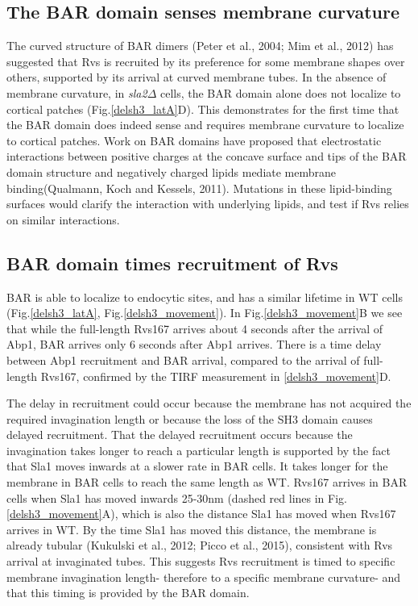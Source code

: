 \subsection{The BAR domain senses membrane curvature}
The curved structure of BAR dimers (Peter et al., 2004; Mim et al., 2012) has suggested that Rvs is recruited by its preference for some membrane shapes over others, supported by its arrival at curved membrane tubes. In the absence of membrane curvature, in \textit{sla2$\Delta$} cells, the BAR domain alone does not localize to cortical patches (Fig.\ref{delsh3_latA}D). This demonstrates for the first time that the BAR domain does indeed sense and requires membrane curvature to localize to cortical patches. Work on BAR domains have proposed that electrostatic interactions between positive charges at the concave surface and tips of the BAR domain structure and negatively charged lipids mediate membrane binding(Qualmann, Koch and Kessels, 2011). Mutations in these lipid-binding surfaces would clarify the interaction with underlying lipids, and test if Rvs relies on similar interactions.



\subsection{BAR domain times recruitment of Rvs} 

BAR is able to localize to endocytic sites, and has a similar lifetime in WT cells (Fig.\ref{delsh3_latA}, Fig.\ref{delsh3_movement}). In Fig.\ref{delsh3_movement}B we see that while the full-length Rvs167 arrives about 4 seconds after the arrival of Abp1, BAR arrives only 6 seconds after Abp1 arrives. There is a time delay between Abp1 recruitment and BAR arrival, compared to the arrival of full-length Rvs167, confirmed by the TIRF measurement in \ref{delsh3_movement}D. 

	\vspace{5mm}
The delay in recruitment could occur because the membrane has not acquired the required invagination length or because the loss of the SH3 domain causes delayed recruitment. That the delayed recruitment occurs because the invagination takes longer to reach a particular length is supported by the fact that Sla1 moves inwards at a slower rate in BAR cells. It takes longer for the membrane in BAR cells to reach the same length as WT. Rvs167 arrives in BAR cells when Sla1 has moved inwards 25-30nm (dashed red lines in Fig.\ref{delsh3_movement}A), which is also the distance Sla1 has moved when Rvs167 arrives in WT. By the time Sla1 has moved this distance, the membrane is already tubular (Kukulski et al., 2012; Picco et al., 2015), consistent with Rvs arrival at invaginated tubes. This suggests Rvs recruitment is timed to specific membrane invagination length- therefore to a specific membrane curvature- and that this timing is provided by the BAR domain. 



